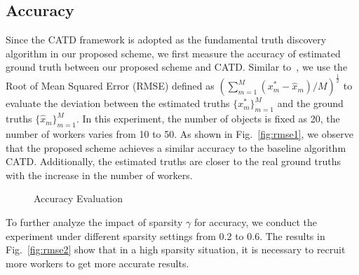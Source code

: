 \documentclass[conference]{IEEEtran}
\begin{document}
\subsection{Accuracy}
Since the CATD framework is adopted as the fundamental truth discovery algorithm in our proposed scheme, we first measure the accuracy of estimated ground truth between our proposed scheme and CATD.
Similar to~\cite{zhang_reliable_2019,xue_inpptd_2020}, we use the Root of Mean Squared Error (RMSE) defined as $(\sum\limits_{m=1}^M (x_m^* - \hat{x}_m)/M)^{\frac{1}{2}}$ to evaluate the deviation between the estimated truths $\{x_m^*\}_{m=1}^M$ and the ground truths $\{\hat{x}_m\}_{m=1}^M$.
In this experiment, the number of objects is fixed as 20, the number of workers varies from 10 to 50.
As shown in Fig.~\ref{fig:rmse1}, we observe that the proposed scheme achieves a similar accuracy to the baseline algorithm CATD.
Additionally, the estimated truths are closer to the real ground truths with the increase in the number of workers.
\begin{figure}[htbp]
  \centering 
  \caption{Accuracy Evaluation}
  \label{fig:rmse} 
\end{figure}
To further analyze the impact of sparsity $\gamma$ for accuracy, we conduct the experiment under different sparsity settings from 0.2 to 0.6.
The results in Fig.~\ref{fig:rmse2} show that in a high sparsity situation, it is necessary to recruit more workers to get more accurate results.
\end{document}
